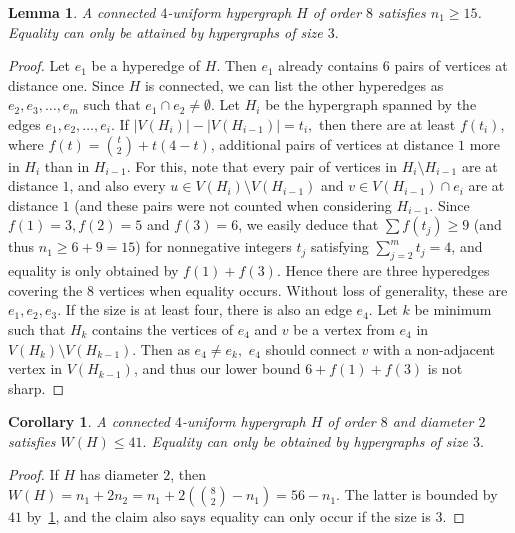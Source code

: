 \documentclass[a4paper,11pt]{article}
\newcommand*{\abs}[1]{\lvert #1\rvert}
\newtheorem{cor}[defi]{Corollary}
\newtheorem{lem}[defi]{Lemma}
\begin{document}
\begin{lem}\label{lem:sizeGE15}
    A connected $4$-uniform hypergraph $H$ of order $8$ satisfies $n_1 \ge 15$. Equality can only be attained by hypergraphs of size $3.$
\end{lem}
\begin{proof}
    Let $e_1$ be a hyperedge of $H$. Then $e_1$ already contains $6$ pairs of vertices at distance one.
    Since $H$ is connected, we can list the other hyperedges as $e_2, e_3, 
    \ldots, e_m$ such that $e_1 \cap e_2 \not= \emptyset.$
    Let $H_i$ be the hypergraph spanned by the edges $e_1, e_2, \ldots, e_i.$
    If $\abs{V(H_i)}-\abs{V(H_{i-1})}=t_i,$ then there are at least $f(t_i)$, where $f(t)=\binom{t}{2}+t(4-t)$, additional pairs of vertices at distance $1$ more in $H_i$ than in $H_{i-1}$.
    For this, note that every pair of vertices in $H_i \setminus H_{i-1}$ are at distance $1$, and also every $u \in V(H_i)\setminus V(H_{i-1})$ and $v \in V(H_{i-1}) \cap e_i$ are at distance $1$ (and these pairs were not counted when considering $H_{i-1}.$
    Since $f(1)=3,f(2)=5$ and $f(3)=6$, we easily deduce that $\sum f(t_j) \ge 9$ (and thus $n_1 \ge 6+9=15$) for nonnegative integers $t_j$ satisfying $\sum_{j=2}^m t_j=4$, and equality is only obtained by $f(1)+f(3).$ 
    Hence there are three hyperedges covering the $8$ vertices when equality occurs. Without loss of generality, these are $e_1,e_2, e_3.$
    If the size is at least four, there is also an edge $e_4.$
    Let $k$ be minimum such that $H_k$ contains the vertices of $e_4$ and $v$ be a vertex from $e_4$ in $ V(H_k)\setminus V(H_{k-1})$.
    Then as $e_4 \not= e_k,$ $e_4$ should connect $v$ with a non-adjacent vertex in $V(H_{k-1})$, and thus our lower bound $6+f(1)+f(3)$ is not sharp.    
\end{proof}


\begin{cor}\label{cor:maxWfordiam2}
    A connected $4$-uniform hypergraph $H$ of order $8$ and diameter $2$ satisfies $W(H) \le 41.$
    Equality can only be obtained by hypergraphs of size $3.$
\end{cor}

\begin{proof}
    If $H$ has diameter $2$, then $W(H)=n_1+2n_2=n_1+2\left( \binom82 - n_1 \right) =56-n_1.$ The latter is bounded by $41$ by~\cref{lem:sizeGE15}, and the claim also says equality can only occur if the size is $3.$
\end{proof}
\end{document}
